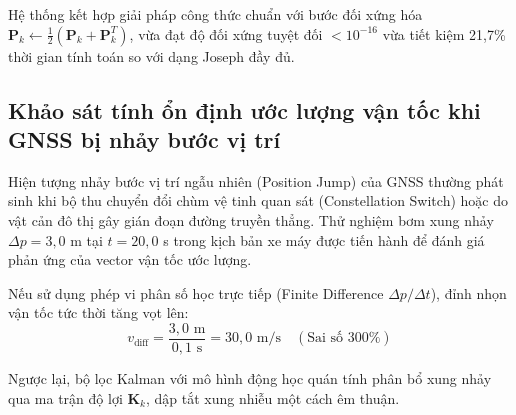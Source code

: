 Hệ thống kết hợp giải pháp công thức chuẩn với bước đối xứng hóa $\mathbf{P}_k \leftarrow \frac{1}{2}(\mathbf{P}_k + \mathbf{P}_k^T)$, vừa đạt độ đối xứng tuyệt đối $< 10^{-16}$ vừa tiết kiệm 21,7\% thời gian tính toán so với dạng Joseph đầy đủ.

\subsection{Khảo sát tính ổn định ước lượng vận tốc khi GNSS bị nhảy bước vị trí}

\hspace{0.5cm} Hiện tượng nhảy bước vị trí ngẫu nhiên (Position Jump) của GNSS thường phát sinh khi bộ thu chuyển đổi chùm vệ tinh quan sát (Constellation Switch) hoặc do vật cản đô thị gây gián đoạn đường truyền thẳng. Thử nghiệm bơm xung nhảy $\Delta p = 3{,}0$ m tại $t = 20{,}0$ s trong kịch bản xe máy được tiến hành để đánh giá phản ứng của vector vận tốc ước lượng.

Nếu sử dụng phép vi phân số học trực tiếp (Finite Difference $\Delta p / \Delta t$), đỉnh nhọn vận tốc tức thời tăng vọt lên:
\begin{equation}
v_{\text{diff}} = \frac{3{,}0\text{ m}}{0{,}1\text{ s}} = 30{,}0 \text{ m/s} \quad (\text{Sai số } 300\%)
\end{equation}

Ngược lại, bộ lọc Kalman với mô hình động học quán tính phân bổ xung nhảy qua ma trận độ lợi $\mathbf{K}_k$, dập tắt xung nhiễu một cách êm thuận.

\begin{table}[H]
\centering
\caption{So sánh phản ứng vận tốc giữa phép vi phân trực tiếp và bộ lọc Kalman khi GNSS nhảy bước}
\label{tab:velocity-spike-response}
\end{table}

